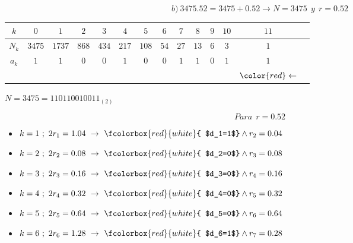 \documentclass[8pt]{beamer}
\begin{document}
\begin{frame}
	$$b) \ 3475.52=3475 + 0.52 \rightarrow N=3475 \ \ y \ \ r=0.52 $$ 
	\begin{center}
		\begin{tabular}{ c| c c c c c c c c c c c c c }
			 \pause[0]$k$  & \pause[4]$0$ & \pause[7]  $1$ & \pause[10]  $2$& \pause[13]  $3$& \pause[16]  $4$& \pause[19]  $5$& \pause[22]  $6$& \pause[25]  $7$ & \pause[28]  $8$& \pause[31]  $9$& \pause[34]  $10$& \pause[37]  $11$&  \pause[0]\\ 
			\hline
			\pause[0]$N_k$	 & \pause[5] $3475$ &\pause[8]  $1737$ & \pause[11]  $868$ & \pause[14]  $434$& \pause[17]  $217$& \pause[20]  $108$& \pause[23]  $54$& \pause[26]  $27$& \pause[29]  $13$& \pause[32]  $6$& \pause[35]  $3$& \pause[38]  $1$\pause[0] \\
			\hline  
			\pause[0]$a_k$  & \pause[6] $1$ &\pause[9] $1$ & \pause[12]  $0$ & \pause[15]  $0$& \pause[18]  $1$ & \pause[21]  $0$ & \pause[24]  $0$& \pause[27]  $1$ & \pause[30]  $1$& \pause[33]  $0$& \pause[36]  $1$& \pause[39]  $1$&  \\
			& & & & & & & & & & & &$\color{red}\leftarrow$& \pause
		\end{tabular}
		\centering$N=3475=110110010011_{(2)}$\pause
	\end{center}
	$$Para \ \ r=0.52$$\pause
	\begin{itemize}
		\item	$k=1 \  ; \ 2r_1=1.04  \ \rightarrow \ \fcolorbox{red}{white}{ $d_1=1$} \wedge r_2=0.04$
		\item[]	$k=2 \  ; \ 2r_2=0.08  \ \rightarrow \ \fcolorbox{red}{white}{ $d_2=0$} \wedge r_3=0.08$
		\item[]	$k=3 \  ; \ 2r_3=0.16  \ \rightarrow \ \fcolorbox{red}{white}{ $d_3=0$} \wedge r_4=0.16$
		\item[]	$k=4 \  ; \ 2r_4=0.32  \ \rightarrow \ \fcolorbox{red}{white}{ $d_4=0$} \wedge r_5=0.32$
		\item[]	$k=5 \  ; \ 2r_5=0.64  \ \rightarrow \ \fcolorbox{red}{white}{ $d_5=0$} \wedge r_6=0.64$
		\item[]	$k=6 \  ; \ 2r_6=1.28  \ \rightarrow \ \fcolorbox{red}{white}{ $d_6=1$} \wedge r_7=0.28$
	\end{itemize}
\end{frame}
\end{document}
